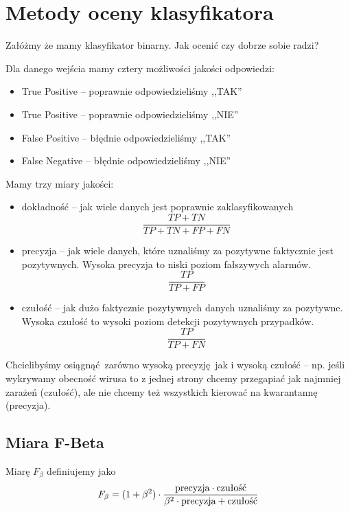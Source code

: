 \section{Metody oceny klasyfikatora}

Załóżmy że mamy klasyfikator binarny. Jak ocenić czy dobrze sobie radzi?

Dla danego wejścia mamy cztery możliwości jakości odpowiedzi:
\begin{itemize}
	\item True Positive -- poprawnie odpowiedzieliśmy ,,TAK''
	\item True Positive -- poprawnie odpowiedzieliśmy ,,NIE''
	\item False Positive -- błędnie odpowiedzieliśmy ,,TAK''
	\item False Negative -- błędnie odpowiedzieliśmy ,,NIE''
\end{itemize}

Mamy trzy miary jakości:
\begin{itemize}
	\item dokładność -- jak wiele danych jest poprawnie zaklasyfikowanych
	      \[
		      \frac{TP + TN}{TP + TN + FP + FN}
	      \]
	\item precyzja -- jak wiele danych, które uznaliśmy za pozytywne faktycznie jest pozytywnych. Wysoka precyzja to niski poziom fałszywych alarmów.
	      \[
		      \frac{TP}{TP + FP}
	      \]
	\item czułość -- jak dużo faktycznie pozytywnych danych uznaliśmy za pozytywne. Wysoka czułość to wysoki poziom detekcji pozytywnych przypadków.
	      \[
		      \frac{TP}{TP + FN}
	      \]
\end{itemize}

Chcielibyśmy osiągnąć zarówno wysoką precyzję jak i wysoką czułość -- np. jeśli wykrywamy obecność wirusa to z jednej strony chcemy przegapiać jak najmniej zarażeń (czułość), ale nie chcemy też wszystkich kierować na kwarantannę (precyzja).

\subsection{Miara F-Beta}

\begin{definition}
	Miarę \( F_\beta \) definiujemy jako
	\[
		F_\beta = (1 + \beta^2) \cdot \frac{\textnormal{precyzja} \cdot \textnormal{czułość}}{\beta^2 \cdot \textnormal{precyzja} + \textnormal{czułość}}
	\]
\end{definition}

